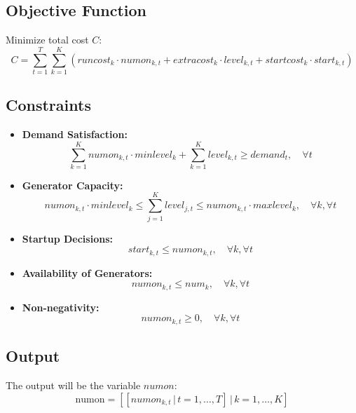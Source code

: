 \documentclass{article}
\begin{document}
\subsection*{Objective Function}
Minimize total cost \( C \):
\[
C = \sum_{t=1}^{T} \sum_{k=1}^{K} \left( runcost_k \cdot numon_{k,t} + extracost_k \cdot level_{k,t} + startcost_k \cdot start_{k,t} \right)
\]

\subsection*{Constraints}
\begin{itemize}
    \item \textbf{Demand Satisfaction:}
    \[
    \sum_{k=1}^{K} numon_{k,t} \cdot minlevel_k + \sum_{k=1}^{K} level_{k,t} \geq demand_t, \quad \forall t
    \]
    
    \item \textbf{Generator Capacity:}
    \[
    numon_{k,t} \cdot minlevel_k \leq \sum_{j=1}^{K} level_{j,t} \leq numon_{k,t} \cdot maxlevel_k, \quad \forall k, \forall t
    \]

    \item \textbf{Startup Decisions:}
    \[
    start_{k,t} \leq numon_{k,t}, \quad \forall k, \forall t
    \]
    
    \item \textbf{Availability of Generators:}
    \[
    numon_{k,t} \leq num_k, \quad \forall k, \forall t
    \]

    \item \textbf{Non-negativity:}
    \[
    numon_{k,t} \geq 0, \quad \forall k, \forall t
    \]
    
\end{itemize}

\subsection*{Output}
The output will be the variable \( numon \):
\[
\text{numon} = \left[ \left[ numon_{k,t} \, | \, t=1,\ldots,T \right] \, | \, k=1,\ldots,K \right]
\]
\end{document}
